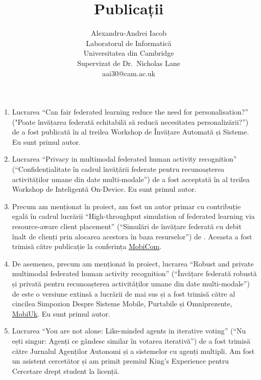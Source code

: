 \documentclass{article}
\title{Publicații}
\author{
  Alexandru-Andrei Iacob \\
  \small Laboratorul de Informatică\\
  \small Universitatea din Cambridge\\
  \small Supervizat de Dr.\ Nicholas Lane\\
  \texttt\small{aai30@cam.ac.uk} \\
}
\begin{document}
\maketitle
% 

\begin{enumerate}
  \item Lucrarea ``Can fair federated learning reduce the need for personalisation?'' ("Poate învățarea federată echitabilă să reducă necesitatea personalizării?'') de \citet{EuroMLSysWorkshop} a fost publicată în al treilea Workshop de Învățare Automată și Sisteme. Eu sunt primul autor.
  \item Lucrarea ``Privacy in multimodal federated human activity recognition'' (``Confidențialitate în cadrul învățării federate pentru recunoașterea activităților umane din date multi-modale'') de \citet{OperaWorkshop} a fost acceptată în al treilea Workshop de Inteligentă On-Device. Eu sunt primul autor.
  \item Precum am menționat în proiect, am fost un autor primar cu contribuție egală în cadrul lucrării ``High-throughput simulation of federated learning via resource-aware client placement'' (``Simulări de învățare federată cu debit înalt de clienți prin alocarea acestora în baza resurselor'') de \citet{Pollen}. Aceasta a fost trimisă către publicație la conferința \href{https://www.sigmobile.org/mobicom/2022/}{MobiCom}.
  \item De asemenea, precum am menționat în proiect, lucrarea ``Robust and private multimodal federated human activity recognition'' (``Învățare federată robustă și privată pentru recunoașterea activităților umane din date multi-modale'') de \citet{MobiUK} este o versiune extinsă a lucrării \citet{OperaWorkshop} de mai sus și a fost trimisă către al cincilea Simpozion Despre Sisteme Mobile, Purtabile și Omniprezente, \href{https://mobiuk.org/2023/}{MobiUk}.  Eu sunt primul autor.
  \item Lucrarea ``You are not alone: Like-minded agents
        in iterative voting'' (``Nu ești singur: Agenți ce gândesc similar în votarea iterativă'') de \citet{IterativeVoting} a fost trimisă către Jurnalul Agenților Autonomi și a sistemelor cu agenți multipli. Am fost un asistent cercetător și am primit premiul King's Experience pentru Cercetare drept student la licență.
\end{enumerate}


{\scriptsize
}

\clearpage

\appendix
% 
\end{document}

